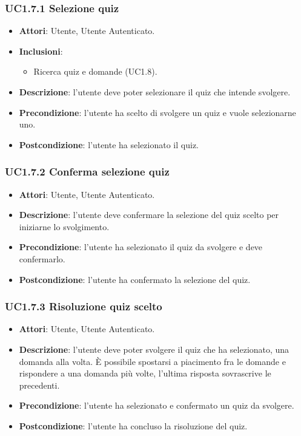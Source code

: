 \subsubsection{UC1.7.1 Selezione quiz}
\begin{itemize}
\item \textbf{Attori}: Utente, Utente Autenticato.
\item \textbf{Inclusioni}:
\begin{itemize}
\item Ricerca quiz e domande (UC1.8).
\end{itemize}
\item \textbf{Descrizione}: l'utente deve poter selezionare il quiz che intende svolgere.
\item \textbf{Precondizione}: l'utente ha scelto di svolgere un quiz e vuole selezionarne uno.
\item \textbf{Postcondizione}: l'utente ha selezionato il quiz.
\end{itemize}
\subsubsection{UC1.7.2 Conferma selezione quiz}
\begin{itemize}
\item \textbf{Attori}: Utente, Utente Autenticato.
\item \textbf{Descrizione}: l'utente deve confermare la selezione del quiz scelto per iniziarne lo svolgimento.
\item \textbf{Precondizione}: l'utente ha selezionato il quiz da svolgere e deve confermarlo.
\item \textbf{Postcondizione}: l'utente ha confermato la selezione del quiz.
\end{itemize}
\subsubsection{UC1.7.3 Risoluzione quiz scelto}
\begin{itemize}
\item \textbf{Attori}: Utente, Utente Autenticato.
\item \textbf{Descrizione}: l'utente deve poter svolgere il quiz che ha selezionato, una domanda alla volta. È possibile spostarsi a piacimento fra le domande e rispondere a una domanda più volte, l'ultima risposta sovrascrive le precedenti.
\item \textbf{Precondizione}: l'utente ha selezionato e confermato un quiz da svolgere.
\item \textbf{Postcondizione}: l'utente ha concluso la risoluzione del quiz.
\end{itemize}
